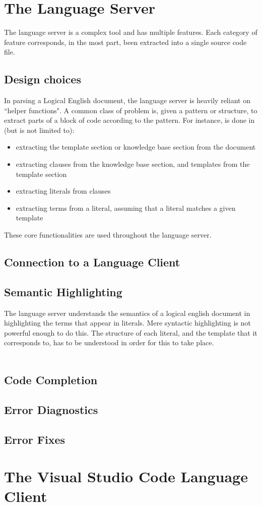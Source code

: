 \documentclass[../main.tex]{subfiles}
\begin{document}
\section{The Language Server}
The language server is a complex tool and has multiple features. Each category of feature corresponds, in the most part, been extracted into a single source code file. 


\subsection{Design choices}
In parsing a Logical English document, the language server is heavily reliant on ``helper functions". A common class of problem is, given a pattern or structure, to extract parts of a block of code according to the pattern. For instance, is done in (but is not limited to):
\begin{itemize}
    \item extracting the template section or knowledge base section from the document
    \item extracting clauses from the knowledge base section, and templates from the template section
    \item extracting literals from clauses
    \item extracting terms from a literal, assuming that a literal matches a given template
\end{itemize}
These core functionalities are used throughout the language server. 


\subsection{Connection to a Language Client}


\subsection{Semantic Highlighting}
The language server understands the semantics of a logical english document in highlighting the terms that appear in literals. Mere syntactic highlighting is not powerful enough to do this. The structure of each literal, and the template that it corresponds to, has to be understood in order for this to take place.
\\ 
\\

\subsection{Code Completion}

\subsection{Error Diagnostics}

\subsection{Error Fixes}

\section{The Visual Studio Code Language Client}
\end{document}
